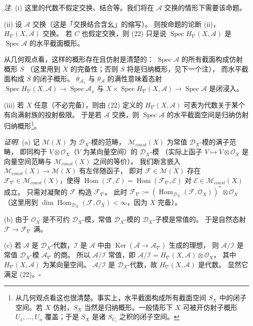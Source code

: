 \emph{注.} (i) 这里的代数不假定交换、结合等。我们将在 $\mathcal{A}$ 交换的情形下需要该命题。

(ii) 设 $\mathcal{A}$ 交换（这是「交换结合含幺」的缩写）。
则按命题的论断 (ii)，$H_\nabla(X,\mathcal{A})$ 交换。
若 $C$ 也假定交换，则 (22) 只是说
$\operatorname{Spec} H_\nabla(X,\mathcal{A})$ 是 $\operatorname{Spec}\mathcal{A}$ 的水平截面概形。

从几何观点看，这样的概形存在且仿射是清楚的：
$\operatorname{Spec}\mathcal{A}$ 的所有截面构成仿射概形 $S$
（这里用到 $X$ 的完备性；否则 $S$ 将是归纳概形，见下一个注），
而水平截面构成 $S$ 的闭子概形。
$\theta_{\mathcal{A}_x}$ 与 $\theta_{\mathcal{A}}$ 的满性意味着态射
$\operatorname{Spec} H_\nabla(X,\mathcal{A})\to\operatorname{Spec}\mathcal{A}_x$
与 $X\times\operatorname{Spec} H_\nabla(X,\mathcal{A})\to\operatorname{Spec}\mathcal{A}$ 是闭浸入。

(iii) 若 $X$ 任意（不必完备），则由 (22) 定义的 $H_\nabla(X,\mathcal{A})$
可表为代数关于某个有向满射族的投射极限。
于是若 $\mathcal{A}$ 交换，则 $\operatorname{Spec}\mathcal{A}$ 的水平截面空间是归纳仿射归纳概形\footnote{从几何观点看这也很清楚。事实上，水平截面构成所有截面空间 $S_X$ 中的闭子空间。若 $X$ 仿射，$S_X$ 当然是归纳概形。一般情形下 $X$ 可被开仿射子概形 $U_1,\dots,U_n$ 覆盖；于是 $S_X$ 是诸 $S_{U_i}$ 之积的闭子空间。}。

\emph{证明.} (a) 记 $\mathcal{M}(X)$ 为 $\mathcal{D}_X$-模的范畴，
$\mathcal{M}_{const}(X)$ 为常值 $\mathcal{D}_X$-模的满子范畴，
即同构于 $V\otimes\mathcal{O}_X$（$V$ 为某向量空间）的 $\mathcal{D}_X$-模
（实际上函子 $V\mapsto V\otimes\mathcal{O}_X$ 是向量空间范畴与 $\mathcal{M}_{const}(X)$ 之间的等价）。
我们断言嵌入 $\mathcal{M}_{const}(X)\to\mathcal{M}(X)$ 有左伴随函子，
即对 $\mathcal{F}\in\mathcal{M}(X)$ 存在 $\mathcal{F}_\nabla\in\mathcal{M}_{const}(X)$，使得
$\operatorname{Hom}(\mathcal{F},\mathcal{E})=\operatorname{Hom}(\mathcal{F}_\nabla,\mathcal{E})$
对 $\mathcal{E}\in\mathcal{M}_{const}(X)$ 成立。
只需对凝聚的 $\mathcal{F}$ 构造 $\mathcal{F}_\nabla$。
此时 $\mathcal{F}_\nabla:=(\operatorname{Hom}_{\mathcal{D}_X}(\mathcal{F},\mathcal{O}_X))^*\otimes\mathcal{O}_X$
（这里用到 $\dim\operatorname{Hom}_{\mathcal{D}_X}(\mathcal{F},\mathcal{O}_X)<\infty$，因为 $X$ 完备）。

(b) 由于 $\mathcal{O}_X$ 是不可约 $\mathcal{D}_X$-模，常值 $\mathcal{D}_X$-模的 $\mathcal{D}_X$-子模是常值的。
于是自然态射 $\mathcal{F}\to\mathcal{F}_\nabla$ 满。

(c) 若 $\mathcal{A}$ 是 $\mathcal{D}_X$-代数，$\mathcal{I}$ 是 $\mathcal{A}$ 中由
$\operatorname{Ker}(\mathcal{A}\to\mathcal{A}_\nabla)$ 生成的理想，
则 $\mathcal{A}/\mathcal{I}$ 是常值 $\mathcal{D}_X$-模 $\mathcal{A}_\nabla$ 的商。
所以 $\mathcal{A}/\mathcal{I}$ 常值，即 $\mathcal{A}/\mathcal{I}=H_\nabla(X,\mathcal{A})\otimes\mathcal{O}_X$，
其中 $H_\nabla(X,\mathcal{A})$ 为某向量空间。
$\mathcal{A}/\mathcal{I}$ 是 $\mathcal{D}_X$-代数，故 $H_\nabla(X,\mathcal{A})$ 是代数。
显然它满足 (22)。\hfill$\square$

